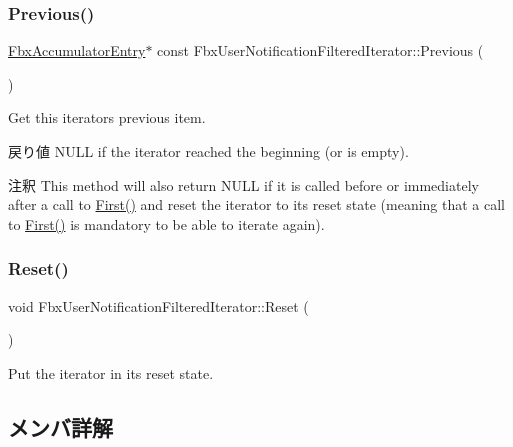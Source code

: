 \subsubsection{\texorpdfstring{Previous()}{Previous()}}
{\footnotesize\ttfamily \hyperlink{class_fbx_accumulator_entry}{Fbx\+Accumulator\+Entry}$\ast$ const Fbx\+User\+Notification\+Filtered\+Iterator\+::\+Previous (\begin{DoxyParamCaption}{ }\end{DoxyParamCaption})}

Get this iterator\textquotesingle{}s previous item. \begin{DoxyReturn}{戻り値}
N\+U\+LL if the iterator reached the beginning (or is empty). 
\end{DoxyReturn}
\begin{DoxyRemark}{注釈}
This method will also return N\+U\+LL if it is called before or immediately after a call to \hyperlink{class_fbx_user_notification_filtered_iterator_a61fc433ba00db459bac761a49e1121a2}{First()} and reset the iterator to its reset state (meaning that a call to \hyperlink{class_fbx_user_notification_filtered_iterator_a61fc433ba00db459bac761a49e1121a2}{First()} is mandatory to be able to iterate again). 
\end{DoxyRemark}
\mbox{\label{class_fbx_user_notification_filtered_iterator_a0cd7bd9eb21f787767d5f603bfb0cf17}} 
\subsubsection{\texorpdfstring{Reset()}{Reset()}}
{\footnotesize\ttfamily void Fbx\+User\+Notification\+Filtered\+Iterator\+::\+Reset (\begin{DoxyParamCaption}{ }\end{DoxyParamCaption})}



Put the iterator in its reset state. 



\subsection{メンバ詳解}
\mbox{\label{class_fbx_user_notification_filtered_iterator_a817f4766f2b7475c68fb596388eed438}} 
